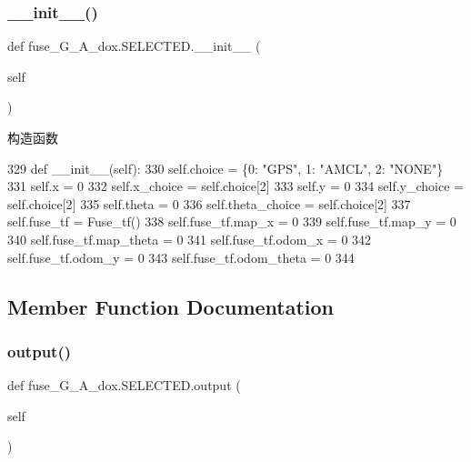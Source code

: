 \subsubsection{\texorpdfstring{\+\_\+\+\_\+init\+\_\+\+\_\+()}{\_\_init\_\_()}}
{\footnotesize\ttfamily def fuse\+\_\+\+G\+\_\+\+A\+\_\+dox.\+S\+E\+L\+E\+C\+T\+E\+D.\+\_\+\+\_\+init\+\_\+\+\_\+ (\begin{DoxyParamCaption}\item[{}]{self }\end{DoxyParamCaption})}



构造函数 


\begin{DoxyCode}
329     \textcolor{keyword}{def }\_\_init\_\_(self):
330         self.choice = \{0: \textcolor{stringliteral}{"GPS"}, 1: \textcolor{stringliteral}{"AMCL"}, 2: \textcolor{stringliteral}{"NONE"}\}
331         self.x = 0
332         self.x\_choice = self.choice[2]
333         self.y = 0
334         self.y\_choice = self.choice[2]
335         self.theta = 0
336         self.theta\_choice = self.choice[2]
337         self.fuse\_tf = Fuse\_tf()
338         self.fuse\_tf.map\_x = 0
339         self.fuse\_tf.map\_y = 0
340         self.fuse\_tf.map\_theta = 0
341         self.fuse\_tf.odom\_x = 0
342         self.fuse\_tf.odom\_y = 0
343         self.fuse\_tf.odom\_theta = 0
344 
\end{DoxyCode}


\subsection{Member Function Documentation}
\mbox{\label{classfuse___g___a__dox_1_1_s_e_l_e_c_t_e_d_a8efba27e917f06d97362295d99021f24}} 
\subsubsection{\texorpdfstring{output()}{output()}}
{\footnotesize\ttfamily def fuse\+\_\+\+G\+\_\+\+A\+\_\+dox.\+S\+E\+L\+E\+C\+T\+E\+D.\+output (\begin{DoxyParamCaption}\item[{}]{self }\end{DoxyParamCaption})}




